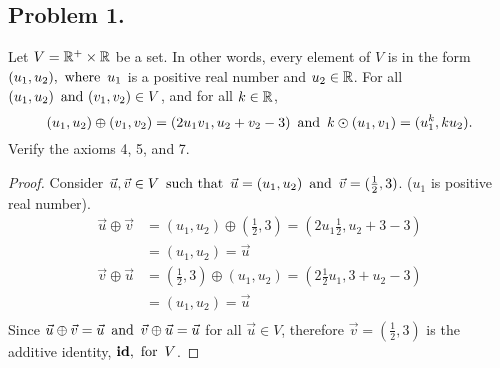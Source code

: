 \documentclass{article}
\begin{document}
\subsection*{Problem 1.}
Let $V = \mathbb{R}^+ \times \mathbb{R}$ be a set. In other words, every element of $V$ is in the form $(u_1, u_2), \operatorname{~\text{where}~} u_1$ is a positive real number and $u_2 \in \mathbb{R}$. For all $(u_1,u_2) \operatorname{~\text{and}~} (v_1,v_2) \in V$, and for all $k \in \mathbb{R}$,
\[
    (u_1,u_2) \oplus (v_1,v_2) = (2u_1v_1, u_2 + v_2 - 3) \operatorname{~\text{and}~} k \odot (u_1,v_1) = (u_1^k, ku_2).
\]
Verify the axioms 4, 5, and 7.

\begin{enumerate}
    \begin{proof}
        Consider $\vec{u}, \vec{v} \in V \operatorname{~\text{such that}~} \vec{u} = (u_1, u_2) \operatorname{~\text{and}~} \vec{v} = (\frac{1}{2}, 3)$. ($u_1$ is positive real number).
        \begin{align*}
            \vec{u} \oplus \vec{v} & = (u_1, u_2) \oplus \left(\frac{1}{2}, 3\right) = \left(2u_1\frac{1}{2}, u_2 + 3 - 3\right) \\
                                   & = (u_1, u_2) = \vec{u}                                                                      \\
            \vec{v} \oplus \vec{u} & = \left(\frac{1}{2}, 3\right) \oplus (u_1, u_2) = \left(2\frac{1}{2}u_1, 3 + u_2 - 3\right) \\
                                   & = (u_1, u_2) = \vec{u}                                                                      \\
        \end{align*}
        Since $\vec{u} \oplus \vec{v} = \vec{u} \operatorname{~\text{and}~} \vec{v} \oplus \vec{u} = \vec{u}$ for all $\vec{u} \in V$, therefore $\vec{v} = (\frac{1}{2}, 3)$ is the additive identity, $\operatorname{\textbf{id}},\operatorname{~\text{for}~} V$.


\end{proof}
\end{enumerate}
\end{document}
